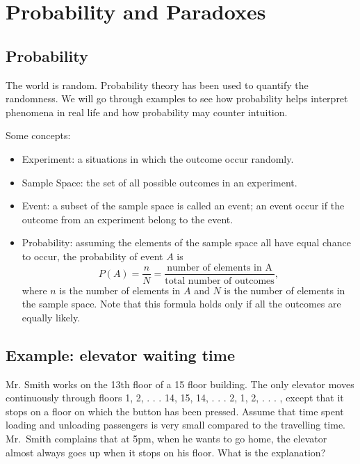 \hypertarget{ch:probability}{%
\chapter{Probability and Paradoxes}\label{ch:probability}}

\hypertarget{probability}{%
\section{Probability}\label{probability}}

The world is random. Probability theory has been used to quantify the
randomness. We will go through examples to see how probability helps
interpret phenomena in real life and how probability may counter
intuition.

Some concepts:
\begin{itemize}
\item Experiment: a situations in which the outcome occur randomly.
\item Sample Space: the set of all possible outcomes in an experiment.
\item Event: a subset of the sample space is called an event; an event
  occur if the outcome from an experiment belong to the event.
\item Probability: assuming the elements of the sample space all have
  equal chance to occur, the probability of event $A$ is\\
  \begin{equation*}
    P(A)=\frac{n}{N}
    =\frac{\text{number of elements in A}}{\text{total number of outcomes}},
  \end{equation*}
  where \(n\) is the number of elements in \(A\) and \(N\) is the
  number of elements in the sample space.  Note that this formula
  holds only if all the outcomes are equally likely.
\end{itemize}

\hypertarget{example-elevator-waiting-time}{%
  \section{Example: elevator waiting
    time}\label{example-elevator-waiting-time}}

Mr. Smith works on the 13th floor of a 15 floor building. The only
elevator moves continuously through floors 1, 2, . . . 14, 15, 14,
. . . 2, 1, 2, . . . , except that it stops on a floor on which the
button has been pressed. Assume that time spent loading and unloading
passengers is very small compared to the travelling time.  Mr.~Smith
complains that at 5pm, when he wants to go home, the elevator almost
always goes up when it stops on his floor. What is the explanation?

